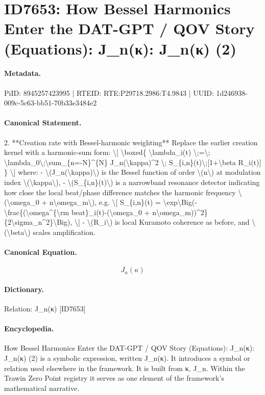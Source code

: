\section*{ID7653: How Bessel Harmonics Enter the DAT-GPT / QOV Story (Equations): J\_n(κ): J\_n(κ) (2)}
\paragraph{Metadata.}
PiID: 8945257423995 | RTEID: RTE:P29718.2986:T4.9843 | UUID: 1d246938-009c-5c63-bb51-70b33e3484e2

\paragraph{Canonical Statement.}
2. **Creation rate with Bessel-harmonic weighting** Replace the earlier creation kernel with a harmonic-sum form: \textbackslash{}[ \textbackslash{}boxed\{ \textbackslash{}lambda\_i(t) \textbackslash{};=\textbackslash{}; \textbackslash{}lambda\_0\textbackslash{};\textbackslash{}sum\_\{n=-N\}\textasciicircum{}\{N\} J\_n(\textbackslash{}kappa)\textasciicircum{}2 \textbackslash{}; S\_\{i,n\}(t)\textbackslash{};[1+\textbackslash{}beta R\_i(t)] \} \textbackslash{}] where: - \textbackslash{}(J\_n(\textbackslash{}kappa)\textbackslash{}) is the Bessel function of order \textbackslash{}(n\textbackslash{}) at modulation index \textbackslash{}(\textbackslash{}kappa\textbackslash{}), - \textbackslash{}(S\_\{i,n\}(t)\textbackslash{}) is a narrowband resonance detector indicating how close the local beat/phase difference matches the harmonic frequency \textbackslash{}(\textbackslash{}omega\_0 + n\textbackslash{}omega\_m\textbackslash{}), e.g. \textbackslash{}[ S\_\{i,n\}(t) = \textbackslash{}exp\textbackslash{}Big(-\textbackslash{}frac\{(\textbackslash{}omega\textasciicircum{}\{\textbackslash{}rm beat\}\_i(t)-(\textbackslash{}omega\_0 + n\textbackslash{}omega\_m))\textasciicircum{}2\}\{2\textbackslash{}sigma\_n\textasciicircum{}2\}\textbackslash{}Big), \textbackslash{}] - \textbackslash{}(R\_i\textbackslash{}) is local Kuramoto coherence as before, and \textbackslash{}(\textbackslash{}beta\textbackslash{}) scales amplification.

\paragraph{Canonical Equation.}
\[
J_n(\kappa)
\]

\paragraph{Dictionary.}
Relation: J\_n(κ) [ID7653]

\paragraph{Encyclopedia.}
How Bessel Harmonics Enter the DAT-GPT / QOV Story (Equations): J\_n(κ): J\_n(κ) (2) is a symbolic expression, written J\_n(κ). It introduces a symbol or relation used elsewhere in the framework. It is built from κ, J\_n. Within the Trawin Zero Point registry it serves as one element of the framework's mathematical narrative.
